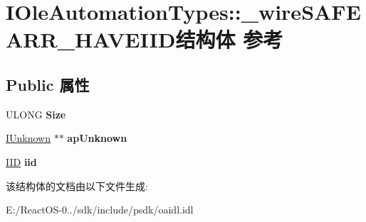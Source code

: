 \hypertarget{struct_i_ole_automation_types_1_1__wire_s_a_f_e_a_r_r___h_a_v_e_i_i_d}{}\section{I\+Ole\+Automation\+Types\+:\+:\+\_\+wire\+S\+A\+F\+E\+A\+R\+R\+\_\+\+H\+A\+V\+E\+I\+I\+D结构体 参考}
\label{struct_i_ole_automation_types_1_1__wire_s_a_f_e_a_r_r___h_a_v_e_i_i_d}
\subsection*{Public 属性}
\begin{DoxyCompactItemize}
\item 
\mbox{\label{struct_i_ole_automation_types_1_1__wire_s_a_f_e_a_r_r___h_a_v_e_i_i_d_a7b5e15984506ce75a260bc8d0403ec3c}} 
U\+L\+O\+NG {\bfseries Size}
\item 
\mbox{\label{struct_i_ole_automation_types_1_1__wire_s_a_f_e_a_r_r___h_a_v_e_i_i_d_a9c1ee325507f7e8cfd0d1dda33a0c79e}} 
\hyperlink{interface_i_unknown}{I\+Unknown} $\ast$$\ast$ {\bfseries ap\+Unknown}
\item 
\mbox{\label{struct_i_ole_automation_types_1_1__wire_s_a_f_e_a_r_r___h_a_v_e_i_i_d_af29417b064dc4518822e1a00cdae4ef5}} 
\hyperlink{struct___i_i_d}{I\+ID} {\bfseries iid}
\end{DoxyCompactItemize}


该结构体的文档由以下文件生成\+:\begin{DoxyCompactItemize}
\item 
E\+:/\+React\+O\+S-\/0../sdk/include/psdk/oaidl.\+idl\end{DoxyCompactItemize}

